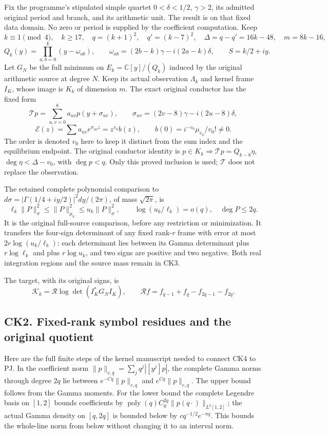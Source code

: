\documentclass[10pt]{article}
\begin{document}
Fix the programme's stipulated simple quartet \(0<\delta<1/2\), \(\gamma>2\), its admitted original period and branch, and its arithmetic unit. The result is on that fixed data domain. No zero or period is supplied by the coefficient computation. Keep \[
 k\equiv1\pmod4,\quad k\ge17,\quad q=(k+1)^2,\quad q'=(k-7)^2,
 \quad\Delta=q-q'=16k-48,\quad m=8k-16,
\] \[
 Q_k(y)=\prod_{a,b=0}^k(y-\omega_{ab}),\qquad
 \omega_{ab}=(2b-k)\gamma-i(2a-k)\delta,\qquad S=k/2+iy.
 \tag{CK1}
\] Let \(G_N\) be the full minimum on \(E_k=\mathbb C[y]/(Q_k)\) induced by the original arithmetic source at degree \(N\). Keep its actual observation \(\Lambda_k\) and kernel frame \(I_K\), whose image is \(K_k\) of dimension \(m\). The exact original conductor has the fixed form \[
 \mathcal Tp=\sum_{u,v=0}^8a_{uv}p(y+\sigma_{uv}),\qquad
 \sigma_{uv}=(2v-8)\gamma-i(2u-8)\delta,
\] \[
 \mathcal E(z)=\sum a_{uv}e^{\sigma_{uv}z}=z^{v_0}b(z),\qquad
 b(0)=i^{-v_0}\mu_{v_0}/v_0!\ne0.
 \tag{CK2}
\] The order is denoted \(v_0\) here to keep it distinct from the sum index and the equilibrium endpoint. The original conductor identity is \(p\in K_k\Rightarrow\mathcal Tp=Q_{k-8}\eta\), \(\deg\eta<\Delta-v_0\), with \(\deg p<q\). Only this proved inclusion is used; \(\mathcal T\) does not replace the observation.

The retained complete polynomial comparison to \(d\sigma=|\Gamma(1/4+iy/2)|^2dy/(2\pi)\), of mass \(\sqrt{2\pi}\), is \[
 \ell_k\|P\|_\sigma^2\le\|P\|_{\mu_k}^2\le u_k\|P\|_\sigma^2,
 \qquad\log(u_k/\ell_k)=o(q),\quad\deg P\le2q.
 \tag{CK3}
\] It is the original full-source comparison, before any restriction or minimization. It transfers the four-sign determinant of any fixed rank-\(r\) frame with error at most \(2r\log(u_k/\ell_k)\): each determinant lies between its Gamma determinant plus \(r\log\ell_k\) and plus \(r\log u_k\), and two signs are positive and two negative. Both real integration regions and the source mass remain in CK3.

The target, with its original signs, is \[
 \mathcal K_k=\mathcal R\log\det(I_K^*G_NI_K),\qquad
 \mathcal Rf=f_{q-1}+f_q-f_{2q-1}-f_{2q}.
 \tag{CK4}
\]

\subsection{CK2. Fixed-rank symbol residues and the original quotient}\label{ck2.-fixed-rank-symbol-residues-and-the-original-quotient}

Here are the full finite steps of the kernel manuscript needed to connect CK4 to PJ. In the coefficient norm \(\|p\|_{c,q}=\sum_jq^j|[y^j]p|\), the complete Gamma norms through degree \(2q\) lie between \(e^{-Cq}\|p\|_{c,q}\) and \(e^{Cq}\|p\|_{c,q}\). The upper bound follows from the Gamma moments. For the lower bound the complete Legendre basis on \([1,2]\) bounds coefficients by \(\operatorname{poly}(q)C_0^{2q}\|p(q\cdot)\|_{L^2[1,2]}\); the actual Gamma density on \([q,2q]\) is bounded below by \(cq^{-1/2}e^{-\pi q}\). This bounds the whole-line norm from below without changing it to an interval norm.
\end{document}
